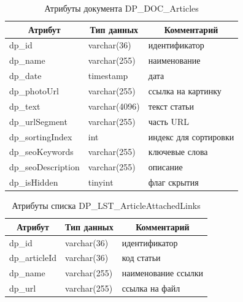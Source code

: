 \begin{table}[p]
    \centering\small

    \caption{Атрибуты документа DP\_DOC\_Articles}
    \label{tab:DP_DOC_Articles}

    \begin{tabular}{|p{5cm}|p{2.5cm}|p{9cm}|}
        \hline
        \multicolumn{1}{|c|}{Атрибут}
        & \multicolumn{1}{c|}{Тип данных}
        & \multicolumn{1}{c|}{Комментарий}
        \\ \hline

        dp\_id & varchar(36) & идентификатор \\ \hline
        dp\_name & varchar(255) & наименование \\ \hline
        dp\_date & timestamp & дата \\ \hline
        dp\_photoUrl & varchar(255) & ссылка на картинку \\ \hline
        dp\_text & varchar(4096) & текст статьи \\ \hline
        dp\_urlSegment & varchar(255) & часть URL \\ \hline
        dp\_sortingIndex & int & индекс для сортировки \\ \hline
        dp\_seoKeywords & varchar(255) & ключевые слова \\ \hline
        dp\_seoDescription & varchar(255) & описание \\ \hline
        dp\_isHidden & tinyint & флаг скрытия \\ \hline
    \end{tabular}
\end{table}

\begin{table}[p]
    \centering\small

    \caption{Атрибуты списка DP\_LST\_ArticleAttachedLinks}
    \label{tab:DP_LST_ArticleAttachedLinks}

    \begin{tabular}{|p{5cm}|p{2.5cm}|p{9cm}|}
        \hline
        \multicolumn{1}{|c|}{Атрибут}
        & \multicolumn{1}{c|}{Тип данных}
        & \multicolumn{1}{c|}{Комментарий}
        \\ \hline

        dp\_id & varchar(36) & идентификатор \\ \hline
        dp\_articleId & varchar(36) & код статьи \\ \hline
        dp\_name & varchar(255) & наименование ссылки \\ \hline
        dp\_url & varchar(255) & ссылка на файл \\ \hline
    \end{tabular}
\end{table}

